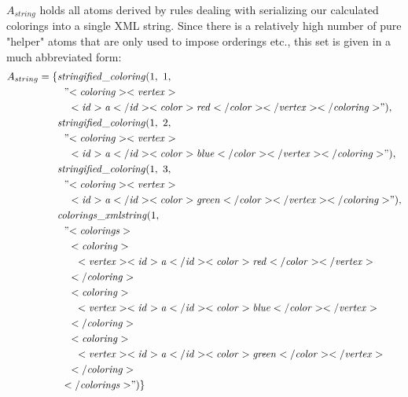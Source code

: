\begin{example}
$A_{string}$ holds all atoms derived by rules dealing with serializing our calculated colorings into a single XML string. Since there is a relatively high number of pure "helper" atoms that are only used to impose orderings etc., this set is given in a much abbreviated form:
\begin{align*}
    A_{string} = \{&\mathit{stringified\_coloring}(1,~1,\\
                   &~~"\mathit{<coloring><vertex>}\\
                   &~~~~\mathit{<id>a</id><color>red</color></vertex></coloring>}"),\\
                   &\mathit{stringified\_coloring}(1,~2,\\
                   &~~"\mathit{<coloring><vertex>}\\
                   &~~~~\mathit{<id>a</id><color>blue</color></vertex></coloring>}"),\\
                   &\mathit{stringified\_coloring}(1,~3,\\
                   &~~"\mathit{<coloring><vertex>}\\
                   &~~~~\mathit{<id>a</id><color>green</color></vertex></coloring>}"),\\
                   &\mathit{colorings\_xmlstring}(1,\\
                   &~~"\mathit{<colorings>}\\
                   &~~~~\mathit{<coloring>}\\
                   &~~~~~~\mathit{<vertex><id>a</id><color>red</color></vertex>}\\
                   &~~~~\mathit{</coloring>}\\
                   &~~~~\mathit{<coloring>}\\
                   &~~~~~~\mathit{<vertex><id>a</id><color>blue</color></vertex>}\\
                   &~~~~\mathit{</coloring>}\\
                   &~~~~\mathit{<coloring>}\\
                   &~~~~~~\mathit{<vertex><id>a</id><color>green</color></vertex>}\\
                   &~~~~\mathit{</coloring>}\\
                   &~~\mathit{</colorings>}")\}
\end{align*}


\end{example}
